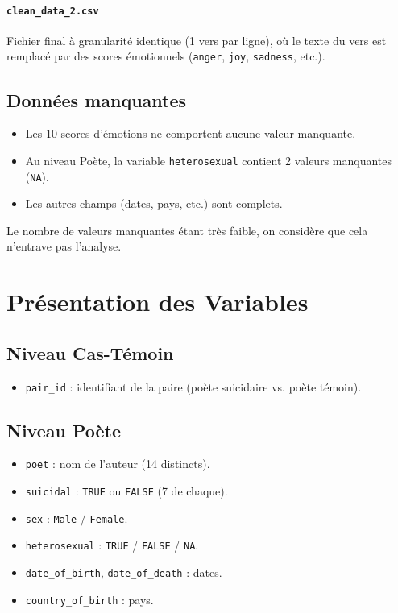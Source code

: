 \documentclass[12pt,a4paper]{article}
\begin{document}
	\paragraph{\texttt{clean\_data\_2.csv}}  
	Fichier final à granularité identique (1 vers par ligne), 
	où le texte du vers est remplacé par des scores émotionnels 
	(\texttt{anger}, \texttt{joy}, \texttt{sadness}, etc.).
	
	\subsection{Données manquantes}
	\begin{itemize}
		\item Les 10 scores d’émotions ne comportent aucune valeur manquante.
		\item Au niveau Poète, la variable \texttt{heterosexual} contient 2 valeurs manquantes (\texttt{NA}).
		\item Les autres champs (dates, pays, etc.) sont complets. 
	\end{itemize}
	Le nombre de valeurs manquantes étant très faible, on considère que cela n’entrave pas l’analyse.
	
	\section{Présentation des Variables}
	
	\subsection{Niveau Cas-Témoin}
	\begin{itemize}
		\item \texttt{pair\_id} : identifiant de la paire (poète suicidaire vs. poète témoin).
	\end{itemize}
	
	\subsection{Niveau Poète}
	\begin{itemize}
		\item \texttt{poet} : nom de l’auteur (14 distincts).
		\item \texttt{suicidal} : \texttt{TRUE} ou \texttt{FALSE} (7 de chaque).
		\item \texttt{sex} : \texttt{Male} / \texttt{Female}.
		\item \texttt{heterosexual} : \texttt{TRUE} / \texttt{FALSE} / \texttt{NA}.
		\item \texttt{date\_of\_birth}, \texttt{date\_of\_death} : dates.
		\item \texttt{country\_of\_birth} : pays.
	\end{itemize}
	
\end{document}
